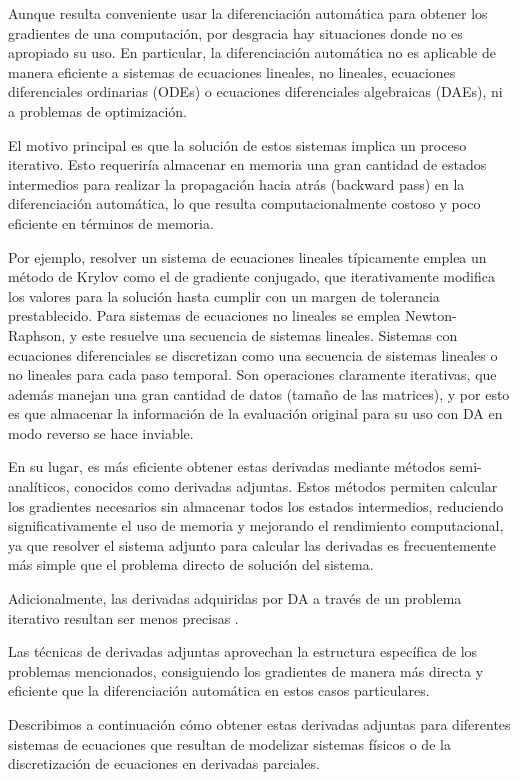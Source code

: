 Aunque resulta conveniente usar la diferenciación automática para obtener los
gradientes de una computación, por desgracia hay situaciones donde no es
apropiado su uso. En particular, la diferenciación automática no es aplicable
de manera eficiente a sistemas de ecuaciones lineales, no lineales, ecuaciones
diferenciales ordinarias (ODEs) o ecuaciones diferenciales algebraicas (DAEs),
ni a problemas de optimización.

El motivo principal es que la solución de estos sistemas implica un proceso
iterativo. Esto requeriría almacenar en memoria una gran cantidad de estados
intermedios para realizar la propagación hacia atrás (backward pass) en la
diferenciación automática, lo que resulta computacionalmente costoso y poco
eficiente en términos de memoria.

Por ejemplo, resolver un sistema de ecuaciones lineales típicamente emplea un
método de Krylov como el de gradiente conjugado, que iterativamente modifica
los valores para la solución hasta cumplir con un margen de tolerancia
prestablecido. Para sistemas de ecuaciones no lineales se emplea
Newton-Raphson, y este resuelve una secuencia de sistemas lineales. Sistemas
con ecuaciones diferenciales se discretizan como una secuencia de sistemas
lineales o no lineales para cada paso temporal. Son operaciones claramente
iterativas, que además manejan una gran cantidad de datos (tamaño de las
matrices), y por esto es que almacenar la información de la evaluación original
para su uso con DA en modo reverso se hace inviable.

En su lugar, es más eficiente obtener estas derivadas mediante métodos
semi-analíticos, conocidos como derivadas adjuntas. Estos métodos permiten
calcular los gradientes necesarios sin almacenar todos los estados intermedios,
reduciendo significativamente el uso de memoria y mejorando el rendimiento
computacional, ya que resolver el sistema adjunto para calcular las derivadas
es frecuentemente más simple que el problema directo de solución del sistema.

Adicionalmente, las derivadas adquiridas por DA a través de un problema
iterativo resultan ser menos precisas \cite{scieur2022curse}.

Las técnicas de derivadas adjuntas aprovechan la estructura específica de los
problemas mencionados, consiguiendo los gradientes de manera más directa y
eficiente que la diferenciación automática en estos casos particulares.

Describimos a continuación cómo obtener estas derivadas adjuntas para
diferentes sistemas de ecuaciones que resultan de modelizar sistemas físicos o
de la discretización de ecuaciones en derivadas parciales.

